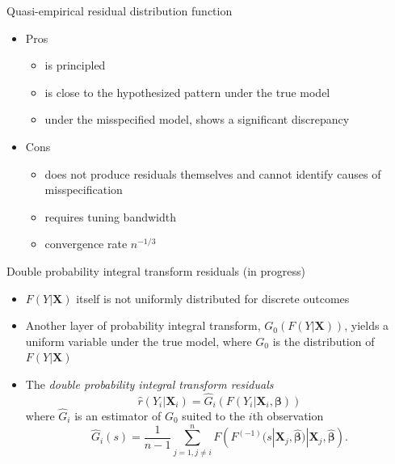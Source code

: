 \documentclass[
  ignorenonframetext,
]{beamer}
\providecommand{\tightlist}{%
  \setlength{\itemsep}{0pt}\setlength{\parskip}{0pt}}
\begin{document}
\begin{frame}{Quasi-empirical residual distribution function}
\protect\hypertarget{quasi-empirical-residual-distribution-function-1}{}
\begin{itemize}
\tightlist
\item
  Pros

  \begin{itemize}
        \item is principled
            \item is close to the hypothesized pattern under the true model
            \item under the misspecified model, shows a significant discrepancy
        \end{itemize}
\item
  Cons

  \begin{itemize}
  \item does not produce residuals themselves and cannot identify causes of misspecification
  \item requires tuning bandwidth
  \item convergence rate $n^{-1/3}$
  \end{itemize}
\end{itemize}
\end{frame}

\begin{frame}{Double probability integral transform residuals (in
progress)}
\protect\hypertarget{double-probability-integral-transform-residuals-in-progress}{}
\begin{itemize}
\tightlist
\item
  \(F(Y|\mathbf{X})\) itself is not uniformly distributed for discrete
  outcomes
\item
  Another layer of probability integral transform,
  \(G_{0}\left(F(Y|\mathbf{X})\right)\), yields a uniform variable under
  the true model, where \(G_{0}\) is the distribution of
  \(F(Y|\mathbf{X})\)
\item
  The \textit{double probability integral transform residuals}
  \[  \hat{r}(Y_i|\mathbf{X}_i)=\hat{G}_{i}\left(F(Y_{i}|\mathbf{X}_i,\bm{\beta})\right)\]
  where \(\hat{G}_{i}\) is an estimator of \(G_{0}\) suited to the
  \(i\)th observation
  \[\hat{G}_{i}(s)=   \frac{1}{n-1}\sum_{j=1,j\neq i}^n {F}\left({F}^{(-1)}(s| \mathbf{X}_{j},\hat{\bm\beta})| \mathbf{X}_{j},\hat{\bm\beta}\right).\]
\end{itemize}
\end{frame}
\end{document}
